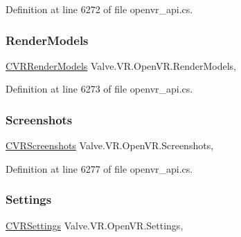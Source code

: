 Definition at line 6272 of file openvr\+\_\+api.\+cs.

\mbox{\label{class_valve_1_1_v_r_1_1_open_v_r_a8edbc1c20720ae5911e5e6c29221b9b5}} 
\subsubsection{\texorpdfstring{RenderModels}{RenderModels}}
{\footnotesize\ttfamily \mbox{\hyperlink{class_valve_1_1_v_r_1_1_c_v_r_render_models}{C\+V\+R\+Render\+Models}} Valve.\+V\+R.\+Open\+V\+R.\+Render\+Models\hspace{0.3cm}{\ttfamily [static]}, {\ttfamily [get]}}



Definition at line 6273 of file openvr\+\_\+api.\+cs.

\mbox{\label{class_valve_1_1_v_r_1_1_open_v_r_aba4df8c153a4f1ac4b8016672df826aa}} 
\subsubsection{\texorpdfstring{Screenshots}{Screenshots}}
{\footnotesize\ttfamily \mbox{\hyperlink{class_valve_1_1_v_r_1_1_c_v_r_screenshots}{C\+V\+R\+Screenshots}} Valve.\+V\+R.\+Open\+V\+R.\+Screenshots\hspace{0.3cm}{\ttfamily [static]}, {\ttfamily [get]}}



Definition at line 6277 of file openvr\+\_\+api.\+cs.

\mbox{\label{class_valve_1_1_v_r_1_1_open_v_r_a4cd1c49540d981e0fba446dc8600e183}} 
\subsubsection{\texorpdfstring{Settings}{Settings}}
{\footnotesize\ttfamily \mbox{\hyperlink{class_valve_1_1_v_r_1_1_c_v_r_settings}{C\+V\+R\+Settings}} Valve.\+V\+R.\+Open\+V\+R.\+Settings\hspace{0.3cm}{\ttfamily [static]}, {\ttfamily [get]}}




